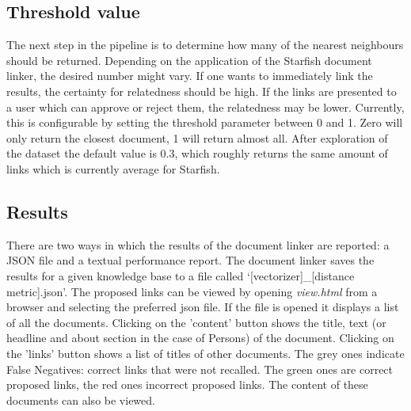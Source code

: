 \subsection{Threshold value}
The next step in the pipeline is to determine how many of the nearest neighbours should be returned. Depending on the application of the Starfish document linker, the desired number might vary. If one wants to immediately link the results, the certainty for relatedness should be high. If the links are presented to a user which can approve or reject them, the relatedness may be lower. Currently, this is configurable by setting the threshold parameter between 0 and 1. Zero will only return the closest document, 1 will return almost all. After exploration of the dataset the default value is 0.3, which roughly returns the same amount of links which is currently average for Starfish.

\subsection{Results}
There are two ways in which the results of the document linker are reported: a JSON file and a textual performance report. The document linker saves the results for a given knowledge base to a file called `[vectorizer]\_[distance metric].json'. The proposed links can be viewed by opening \emph{view.html} from a browser and selecting the preferred json file. If the file is opened it displays a list of all the documents. Clicking on the 'content' button shows the title, text (or headline and about section in the case of Persons) of the document. Clicking on the 'links' button shows a list of titles of other documents. The grey ones indicate False Negatives: correct links that were not recalled. The green ones are correct proposed links, the red ones incorrect proposed links. The content of these documents can also be viewed. 
